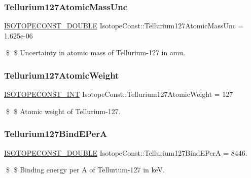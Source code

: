 \subsubsection{\texorpdfstring{Tellurium127\+Atomic\+Mass\+Unc}{Tellurium127AtomicMassUnc}}
{\footnotesize\ttfamily \mbox{\hyperlink{group___isotope_const-_macros_ga8f45a7272ce02c0b4c65c44636ed719a}{I\+S\+O\+T\+O\+P\+E\+C\+O\+N\+S\+T\+\_\+\+D\+O\+U\+B\+LE}} Isotope\+Const\+::\+Tellurium127\+Atomic\+Mass\+Unc = 1.\+625e-\/06}

\$ \$ Uncertainty in atomic mass of Tellurium-\/127 in amu. \mbox{\label{group___isotope_const-_tellurium-_te127_ga4b7c3ea0026bcc6e9e371ca4e6316a69}} 
\subsubsection{\texorpdfstring{Tellurium127\+Atomic\+Weight}{Tellurium127AtomicWeight}}
{\footnotesize\ttfamily \mbox{\hyperlink{group___isotope_const-_macros_ga5f18360b3e99483a35c32d789e62621c}{I\+S\+O\+T\+O\+P\+E\+C\+O\+N\+S\+T\+\_\+\+I\+NT}} Isotope\+Const\+::\+Tellurium127\+Atomic\+Weight = 127}

\$ \$ Atomic weight of Tellurium-\/127. \mbox{\label{group___isotope_const-_tellurium-_te127_ga446f722d18ed4feecdfa422fa5636086}} 
\subsubsection{\texorpdfstring{Tellurium127\+Bind\+E\+PerA}{Tellurium127BindEPerA}}
{\footnotesize\ttfamily \mbox{\hyperlink{group___isotope_const-_macros_ga8f45a7272ce02c0b4c65c44636ed719a}{I\+S\+O\+T\+O\+P\+E\+C\+O\+N\+S\+T\+\_\+\+D\+O\+U\+B\+LE}} Isotope\+Const\+::\+Tellurium127\+Bind\+E\+PerA = 8446.}

\$ \$ Binding energy per A of Tellurium-\/127 in keV. \mbox{\label{group___isotope_const-_tellurium-_te127_gadf6a74f795dd3f2f58390f1c83aa8425}} 
